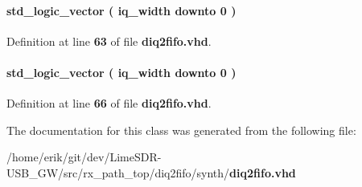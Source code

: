 \paragraph[{mux0\+\_\+diq\+\_\+l}]{ {\bfseries \textcolor{comment}{std\+\_\+logic\+\_\+vector}\textcolor{vhdlchar}{ }\textcolor{vhdlchar}{(}\textcolor{vhdlchar}{ }\textcolor{vhdlchar}{ }\textcolor{vhdlchar}{ }\textcolor{vhdlchar}{ }{\bfseries {\bf iq\+\_\+width}} \textcolor{vhdlchar}{ }\textcolor{keywordflow}{downto}\textcolor{vhdlchar}{ }\textcolor{vhdlchar}{ } \textcolor{vhdldigit}{0} \textcolor{vhdlchar}{ }\textcolor{vhdlchar}{)}\textcolor{vhdlchar}{ }} \hspace{0.3cm}{\ttfamily [Signal]}}\label{classdiq2fifo_1_1arch_a4c0ab8e077795fee692bd216015daa7b}


Definition at line {\bf 63} of file {\bf diq2fifo.\+vhd}.

\paragraph[{mux0\+\_\+diq\+\_\+l\+\_\+reg}]{ {\bfseries \textcolor{comment}{std\+\_\+logic\+\_\+vector}\textcolor{vhdlchar}{ }\textcolor{vhdlchar}{(}\textcolor{vhdlchar}{ }\textcolor{vhdlchar}{ }\textcolor{vhdlchar}{ }\textcolor{vhdlchar}{ }{\bfseries {\bf iq\+\_\+width}} \textcolor{vhdlchar}{ }\textcolor{keywordflow}{downto}\textcolor{vhdlchar}{ }\textcolor{vhdlchar}{ } \textcolor{vhdldigit}{0} \textcolor{vhdlchar}{ }\textcolor{vhdlchar}{)}\textcolor{vhdlchar}{ }} \hspace{0.3cm}{\ttfamily [Signal]}}\label{classdiq2fifo_1_1arch_a6e7f3decb142b7e16ad31da5ca9dac03}


Definition at line {\bf 66} of file {\bf diq2fifo.\+vhd}.



The documentation for this class was generated from the following file\+:\begin{DoxyCompactItemize}
\item 
/home/erik/git/dev/\+Lime\+S\+D\+R-\/\+U\+S\+B\+\_\+\+G\+W/src/rx\+\_\+path\+\_\+top/diq2fifo/synth/{\bf diq2fifo.\+vhd}\end{DoxyCompactItemize}

